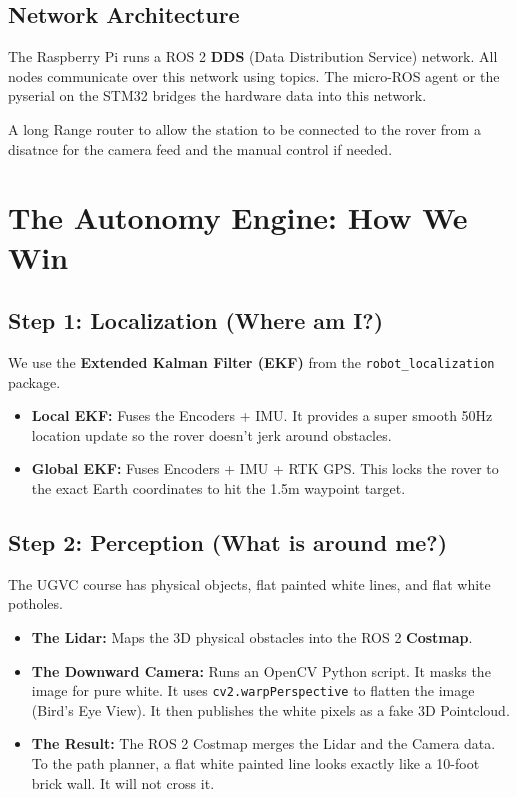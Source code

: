 \documentclass[12pt, a4paper]{article}
\begin{document}
\subsection{Network Architecture}
The Raspberry Pi runs a ROS 2 \textbf{DDS} (Data Distribution Service) network. All nodes communicate over this network using topics. The micro-ROS agent or the pyserial on the STM32 bridges the hardware data into this network.

A long Range router to allow the station to be connected to the rover from a disatnce for the camera feed and the manual control if needed.

\newpage

\section{The Autonomy Engine: How We Win}

\subsection{Step 1: Localization (Where am I?)}
We use the \textbf{Extended Kalman Filter (EKF)} from the \texttt{robot\_localization} package.
\begin{itemize}
    \item \textbf{Local EKF:} Fuses the Encoders + IMU. It provides a super smooth 50Hz location update so the rover doesn't jerk around obstacles.
    \item \textbf{Global EKF:} Fuses Encoders + IMU + RTK GPS. This locks the rover to the exact Earth coordinates to hit the 1.5m waypoint target.
\end{itemize}

\subsection{Step 2: Perception (What is around me?)}
The UGVC course has physical objects, flat painted white lines, and flat white potholes.
\begin{itemize}
    \item \textbf{The Lidar:} Maps the 3D physical obstacles into the ROS 2 \textbf{Costmap}.
    \item \textbf{The Downward Camera:} Runs an OpenCV Python script. It masks the image for pure white. It uses \texttt{cv2.warpPerspective} to flatten the image (Bird's Eye View). It then publishes the white pixels as a fake 3D Pointcloud.
    \item \textbf{The Result:} The ROS 2 Costmap merges the Lidar and the Camera data. To the path planner, a flat white painted line looks exactly like a 10-foot brick wall. It will not cross it.
\end{itemize}
\end{document}
